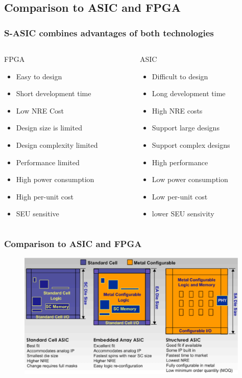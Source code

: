\documentclass{beamer}
\begin{document}
\subsection{Comparison to ASIC and FPGA}
\frame
{
  \frametitle{S-ASIC combines advantages of both technologies}
  \begin{columns}
  \begin{column}[l]{5cm}
  FPGA
  \begin{itemize}
  \item {\color{green!40!gray}Easy to design}
  \item {\color{green!40!gray}Short development time}
  \item {\color{green!40!gray}Low NRE Cost}
  \item {\color{red}Design size is limited}
  \item {\color{red}Design complexity limited}
  \item {\color{red}Performance limited}
  \item {\color{red}High power consumption}
  \item {\color{red}High per-unit cost}
  \item {\color{red}SEU sensitive}
  \end{itemize}
  \end{column}
  \begin{column}[r]{5cm}
  ASIC
  \begin{itemize}
  \item {\color{red}Difficult to design}
  \item {\color{red}Long development time}
  \item {\color{red}High NRE costs}
  \item {\color{green!40!gray}Support large designs}
  \item {\color{green!40!gray}Support complex designs}
  \item {\color{green!40!gray}High performance}
  \item {\color{green!40!gray}Low power consumption}
  \item {\color{green!40!gray}Low per-unit cost}
  \item {\color{green!40!gray}lower SEU sensivity}
  \end{itemize}
  \end{column}
  \end{columns}
}

\frame
{
  \frametitle{Comparison to ASIC and FPGA}
  \begin{figure}[H]
  \includegraphics[height=60mm]{images/comparison_to_asic.eps}
  \end{figure}
}
\end{document}
